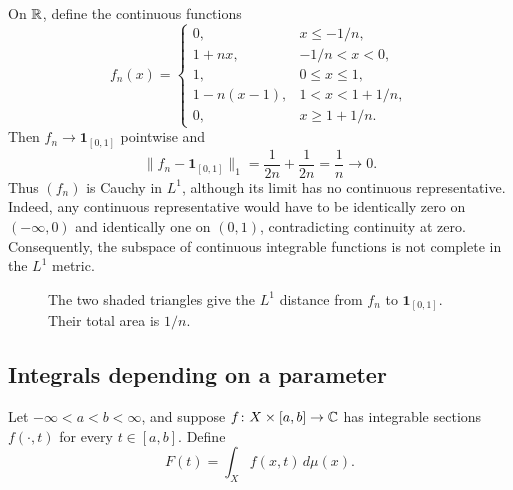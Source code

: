 \begin{example}
  On $\mathbb{R}$, define the continuous functions
  \[
    f_n(x)=
    \begin{cases}
      0,&x\leq-1/n,\\
      1+nx,&-1/n<x<0,\\
      1,&0\leq x\leq1,\\
      1-n(x-1),&1<x<1+1/n,\\
      0,&x\geq1+1/n.
    \end{cases}
  \]
  Then $f_n\to\mathbf 1_{[0,1]}$ pointwise and
  \[
    \|f_n-\mathbf 1_{[0,1]}\|_1
      =\frac1{2n}+\frac1{2n}=\frac1n\longrightarrow0.
  \]
  Thus $(f_n)$ is Cauchy in $L^1$, although its limit has no continuous
  representative. Indeed, any continuous representative would have
  to be identically zero on $(-\infty,0)$ and identically one on
  $(0,1)$, contradicting continuity at zero. Consequently, the
  subspace of continuous integrable functions is not complete in the
  $L^1$ metric.
\end{example}

\begin{figure}[htbp]
  \centering
  \caption{The two shaded triangles give the $L^1$ distance from
    $f_n$ to $\mathbf 1_{[0,1]}$. Their total area is $1/n$.}
  \label{fig:continuous-l1-approximation-sep-29}
\end{figure}

\FloatBarrier

\subsection{Integrals depending on a parameter}

Let $-\infty<a<b<\infty$, and suppose
$f\colon X\times[a,b]\to\mathbb{C}$ has integrable sections
$f(\cdot,t)$ for every $t\in[a,b]$. Define
\[
  F(t)=\int_X f(x,t)\,d\mu(x).
\]

